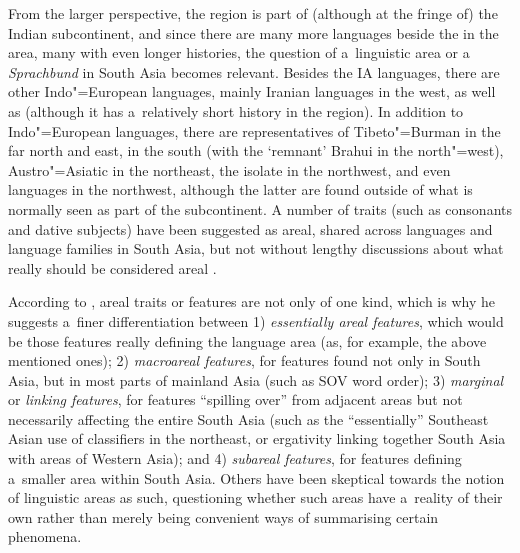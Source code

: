 \largerpage[-1]
From the larger perspective, the region is part of (although at the fringe of) the Indian subcontinent, and since there are many more languages beside the \iliIndoAryan in the area, many with even longer histories, the question of a~linguistic area or a \textit{Sprachbund} in South Asia becomes relevant. Besides the IA languages, there are other Indo"=European languages, mainly Iranian languages in the west, as well as \iliEnglish (although it has a~relatively short history in the region). In addition to Indo"=European languages, there are representatives of Tibeto"=Burman in the far north and east, \iliDravidian in the south (with the `remnant' Brahui in the north"=west), Austro"=Asiatic in the northeast, the isolate \iliBurushaski in the northwest, and even \iliTurkic languages in the northwest, although the latter are found outside of what is normally seen as part of the subcontinent. A number of traits (such as  consonants and dative subjects) have been suggested as areal, shared across languages and language families in South Asia, but not without lengthy discussions about what really should be considered areal \citep{emeneau1965,emeneau1980,masica1976,masica1991,masica2001,ebert2006}.


According to \citet{masica2001}, areal traits or features are not only of one kind, which is why he suggests a~finer differentiation between 1) \textit{essentially areal features}, which would be those features really defining the language area (as, for example, the above mentioned ones); 2) \textit{macroareal features}, for features found not only in South Asia, but in most parts of mainland Asia (such as SOV word order); 3) \textit{marginal} or \textit{linking features}, for features ``spilling over'' from adjacent areas but not necessarily affecting the entire South Asia (such as the ``essentially'' Southeast Asian use of  classifiers in the northeast, or ergativity linking together South Asia with areas of Western Asia); and 4) \textit{subareal features}, for features defining a~smaller area within South Asia. Others \citep{dahl2001,ktammwaelchli2001} have been skeptical towards the notion of linguistic areas as such, questioning whether such areas have a~reality of their own rather than merely being convenient ways of summarising certain phenomena. 


